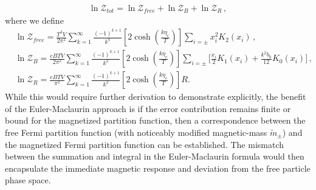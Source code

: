 \documentclass[Universe,article,submit,moreauthors,pdftex]{Definitions/mdpi}
\begin{document}
\begin{align}
  \ln\mathcal{Z}_{tot}=\ln\mathcal{Z}_{free}+\ln\mathcal{Z}_B+\ln\mathcal{Z}_R\,,
\end{align}
where we define 
\begin{align}
  \label{FreePart}&\ln\mathcal{Z}_{free}=\frac{T^3V}{2\pi^2}\sum^{\infty}_{k=1}\frac{(-1)^{k+1}}{k^4}\left[2\cosh{\left(\frac{k\eta_{e}}{T}\right)}\right]\sum_{i=\pm}x_i^2K_2\left(x_i\right)\,,\\
  \label{MagPart}&\ln\mathcal{Z}_B=\frac{eBTV}{2\pi^2}\sum^{\infty}_{k=1}\frac{(-1)^{k+1}}{k^2}\left[2\cosh{\left(\frac{k\eta_{e}}{T}\right)}\right]\sum_{i=\pm}\bigg[\frac{x_i}{2}K_1\left(x_i\right)+\frac{k^2b_0}{12}K_0\left(x_i\right)\bigg]\,,\\
  \label{ErrorPart}&\ln\mathcal{Z}_R=\frac{eBTV}{\pi^2}\sum^{\infty}_{k=1}\frac{(-1)^{k+1}}{k^2}\left[2\cosh{\left(\frac{k\eta_{e}}{T}\right)}\right]R.
\end{align}
While this would require further derivation to demonstrate explicitly, the benefit of the Euler-Maclaurin approach is if the error contribution remains finite or bound for the magnetized partition function, then a correspondence between the free Fermi partition function (with noticeably modified magnetic-mass $\tilde{m}_{\pm}$) and the magnetized Fermi partition function can be established. The mismatch between the summation and integral in the Euler-Maclaurin formula would then encapsulate the immediate magnetic response and deviation from the free particle phase space.

\end{document}
